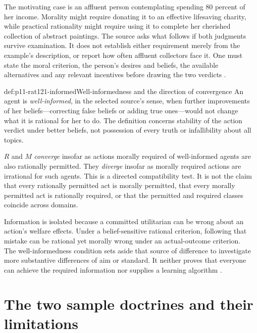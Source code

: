 The motivating case is an affluent person contemplating spending
80 percent of her income. Morality might require donating it to an
effective lifesaving charity, while practical rationality might require
using it to complete her cherished collection of abstract paintings.
The source asks what follows if both judgments survive examination.
It does not establish either requirement merely from the example's
description, or report how often affluent collectors face it. One must
state the moral criterion, the person's desires and beliefs, the
available alternatives and any relevant incentives before drawing the
two verdicts \parencite[p.~681]{FehigeWessels2021Morality}.

\begin{hbdefinition}{def:p11-rat121-informed}{Well-informedness and the direction of convergence}
An agent is \emph{well-informed}, in the selected source's sense, when
further improvements of her beliefs---correcting false beliefs or
adding true ones---would not change what it is rational for her to do.
The definition concerns stability of the action verdict under better
beliefs, not possession of every truth or infallibility about all topics.

\(R\) and \(M\) \emph{converge} insofar as actions morally
required of well-informed agents are also rationally permitted.
They \emph{diverge} insofar as morally required actions are irrational
for such agents. This is a directed compatibility test. It is not the
claim that every rationally permitted act is morally permitted, that
every morally permitted act is rationally required, or that the
permitted and required classes coincide across domains.
\end{hbdefinition}

Information is isolated because a committed utilitarian can be wrong
about an action's welfare effects. Under a belief-sensitive rational
criterion, following that mistake can be rational yet morally wrong
under an actual-outcome criterion. The well-informedness condition
sets aside that source of difference to investigate more substantive
differences of aim or standard. It neither proves that everyone can
achieve the required information nor supplies a learning algorithm
\parencite[p.~682]{FehigeWessels2021Morality}.

\section{The two sample doctrines and their limitations}
\label{sec:p11-rat121-samples}

